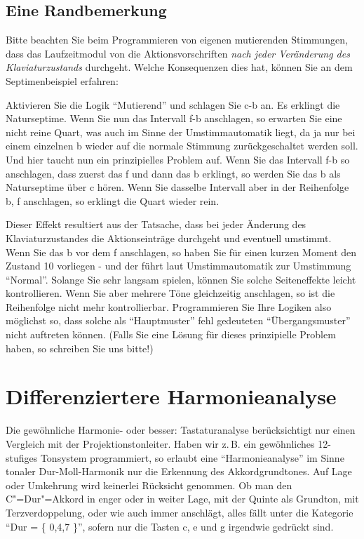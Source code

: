 \subsection{Eine Randbemerkung}\label{sec:eine-randbemerkung-1}
Bitte beachten Sie beim Programmieren von eigenen mutierenden
Stimmungen, dass das Laufzeitmodul von \mutabor{} die
Aktionsvorschriften \emph{nach jeder Veränderung des Klaviaturzustands}
durchgeht. Welche Konsequenzen dies hat, können Sie an dem
Septimenbeispiel erfahren:

Aktivieren Sie die Logik "`Mutierend"' und schlagen Sie c-b an. Es
erklingt die Naturseptime. Wenn Sie nun das Intervall f-b
anschlagen, so erwarten Sie eine nicht reine Quart, was auch im
Sinne der Umstimmautomatik liegt, da ja nur bei einem einzelnen b
wieder auf die normale Stimmung zurückgeschaltet werden soll. Und
hier taucht nun ein prinzipielles Problem auf. Wenn Sie das
Intervall f-b so anschlagen, dass zuerst das f und dann das b
erklingt, so werden Sie das b als Naturseptime über c hören. Wenn Sie
dasselbe Intervall aber in der Reihenfolge b, f anschlagen, so
erklingt die Quart wieder rein.

Dieser Effekt resultiert aus der
Tatsache, dass \mutabor{} bei jeder Änderung des 
Klaviaturzustandes die Aktionseinträge durchgeht und eventuell
umstimmt. Wenn Sie das b vor dem f anschlagen, so haben Sie für
einen kurzen Moment den Zustand {10} vorliegen - und der führt
laut Umstimmautomatik zur Umstimmung "`Normal"'. Solange Sie sehr
langsam spielen, können Sie solche Seiteneffekte leicht
kontrollieren. Wenn Sie aber mehrere Töne gleichzeitig anschlagen,
so ist die Reihenfolge nicht mehr kontrollierbar. Programmieren
Sie Ihre Logiken also möglichst so, dass solche als "`Hauptmuster"'
fehl gedeuteten "`Übergangsmuster"' nicht auftreten können. (Falls
Sie eine Lösung für dieses prinzipielle Problem haben, so
schreiben Sie uns bitte!)

\section{Differenziertere Harmonieanalyse}
\label{UNMOEGLICHER}
 Die gewöhnliche Harmonie- oder
besser: Tastaturanalyse berücksichtigt nur einen Vergleich mit der
Projektionstonleiter.  Haben wir z.\,B. ein gewöhnliches 12-stufiges
Tonsystem programmiert, so erlaubt eine "`Harmonieanalyse"' im Sinne
tonaler Dur-Moll-Harmonik nur die Erkennung des Akkordgrundtones. Auf
Lage oder Umkehrung wird keinerlei Rücksicht genommen. Ob man den
C"=Dur"=Akkord in enger oder in weiter Lage, mit der Quinte als
Grundton, mit Terzverdoppelung, oder wie auch immer anschlägt, alles
fällt unter die Kategorie "`Dur = \{ 0,4,7 \}"', sofern nur die Tasten
c, e und g irgendwie gedrückt sind.


